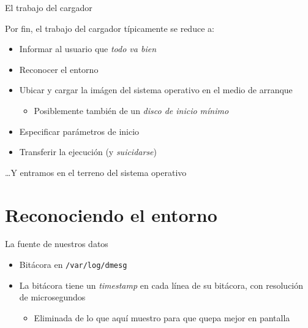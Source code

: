\documentclass[presentation]{beamer}
\begin{document}
\begin{frame}[label={sec:orge4dfd75}]{El trabajo del cargador}
\begin{center}
Por fin, el trabajo del cargador típicamente se reduce a:
\end{center}
\begin{itemize}
\item Informar al usuario que \emph{todo va bien}
\item Reconocer el entorno
\item Ubicar y cargar la imágen del sistema operativo en el medio de
arranque
\begin{itemize}
\item Posiblemente también de un \emph{disco de inicio mínimo}
\end{itemize}
\item Especificar parámetros de inicio
\item Transferir la ejecución (y \emph{suicidarse})
\end{itemize}
\begin{center}
\ldots{}Y entramos en el terreno del sistema operativo
\end{center}
\end{frame}

\section{Reconociendo el entorno}
\label{sec:org485ee87}
\begin{frame}[label={sec:orgaf0120b},fragile]{La fuente de nuestros datos}
 \begin{itemize}
\item Bitácora en \texttt{/var/log/dmesg}
\item La bitácora tiene un \emph{timestamp} en cada línea de su bitácora, con
resolución de microsegundos
\begin{itemize}
\item Eliminada de lo que aquí muestro para que quepa mejor en pantalla
\end{itemize}
\end{itemize}
\end{frame}
\end{document}
